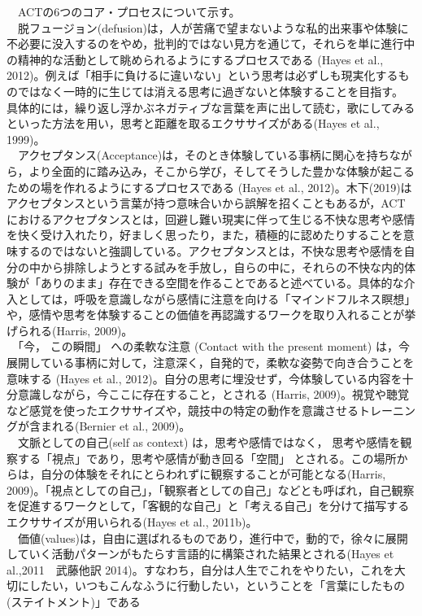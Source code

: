\documentclass[12pt,a4paper,xelatex,ja=standard]{bxjsarticle}
\begin{document}
　ACTの6つのコア・プロセスについて示す。\\
　脱フュージョン(defusion)は，人が苦痛で望まないような私的出来事や体験に不必要に没入するのをやめ，批判的ではない見方を通じて，それらを単に進行中の精神的な活動として眺められるようにするプロセスである
(Hayes et al.,
2012)。例えば「相手に負けるに違いない」という思考は必ずしも現実化するものではなく一時的に生じては消える思考に過ぎないと体験することを目指す。
具体的には，繰り返し浮かぶネガティブな言葉を声に出して読む，歌にしてみるといった方法を用い，思考と距離を取るエクササイズがある(Hayes
et al., 1999)。\\
　アクセプタンス(Acceptance)は，そのとき体験している事柄に関心を持ちながら，より全面的に踏み込み，そこから学び，そしてそうした豊かな体験が起こるための場を作れるようにするプロセスである
(Hayes et al.,
2012)。木下(2019)はアクセプタンスという言葉が持つ意味合いから誤解を招くこともあるが，ACTにおけるアクセプタンスとは，回避し難い現実に伴って生じる不快な思考や感情を快く受け入れたり，好ましく思ったり，また，積極的に認めたりすることを意味するのではないと強調している。アクセプタンスとは，不快な思考や感情を自分の中から排除しようとする試みを手放し，自らの中に，それらの不快な内的体験が「ありのまま」存在できる空間を作ることであると述べている。具体的な介入としては，呼吸を意識しながら感情に注意を向ける「マインドフルネス瞑想」や，感情や思考を体験することの価値を再認識するワークを取り入れることが挙げられる(Harris,
2009)。\\
　「今， この瞬間」 への柔軟な注意 (Contact with the present moment)
は，今展開している事柄に対して，注意深く，自発的で，柔軟な姿勢で向き合うことを意味する
(Hayes et al.,
2012)。自分の思考に埋没せず，今体験している内容を十分意識しながら，今ここに存在すること，とされる
(Harris,
2009)。視覚や聴覚など感覚を使ったエクササイズや，競技中の特定の動作を意識させるトレーニングが含まれる(Bernier
et al., 2009)。\\
　文脈としての自己(self as context) は，思考や感情ではなく，
思考や感情を観察する「視点」であり，思考や感情が動き回る「空間」
とされる。この場所からは，自分の体験をそれにとらわれずに観察することが可能となる(Harris,
2009)。「視点としての自己」，「観察者としての自己」などとも呼ばれ，自己観察を促進するワークとして，「客観的な自己」と「考える自己」を分けて描写するエクササイズが用いられる(Hayes
et al., 2011b)。\\
　価値(values)は，自由に選ばれるものであり，進行中で，動的で，徐々に展開していく活動パターンがもたらす言語的に構築された結果とされる(Hayes
et al.,2011　武藤他訳
2014)。すなわち，自分は人生でこれをやりたい，これを大切にしたい，いつもこんなふうに行動したい，ということを「言葉にしたもの(ステイトメント)」である
\end{document}
